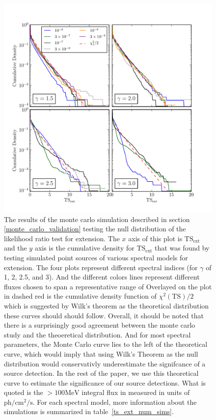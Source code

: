 \documentclass[preprint]{aastex}
\newcommand{\mev}{\text{MeV}\xspace}
\newcommand{\s}{\text{s}\xspace}
\newcommand{\ph}{\text{ph}\xspace}
\newcommand{\cm}{\text{cm}\xspace}
\newcommand{\tsext}{\ensuremath{\text{TS}_\text{ext}}\xspace}
\newcommand{\ts}{\text{TS}\xspace}
\begin{document}
\clearpage
\begin{figure}
  \begin{center}
    \includegraphics{mc_plots/ts_ext_emin_1000.pdf}
    \end{center}
    \caption{
    The results of the monte carlo simulation described in section
    \ref{monte_carlo_validation} testing the null distribution of
    the likelihood ratio test for extension.  The $x$ axis of this
    plot is \tsext and the $y$ axis is the cumulative density for
    \tsext that was found by testing simulated point sources of
    various spectral models for extension. The four plots represent
    different spectral indices (for $\gamma$ of 1, 2, 2.5, and 3).
    And the different colors lines represent different fluxes chosen
    to span a representative range of Overlayed on the plot in dashed
    red is the cumulative density function of $\chi^2(\ts)/2$ which is
    suggested by Wilk's theorem as the theoretical distribution these
    curves should should follow.  Overall, it should be noted that there
    is a surprisingly good agreement between the monte carlo study and
    the theoeretical distribution. And for most spectral parameters, the
    Monte Carlo curve lies to the left of the theoretical curve, which
    would imply that using Wilk's Theorem as the null distribution would
    conservativly underestimate the signifcance of a source detection. In
    the rest of the paper, we use this theoretical curve to estimate
    the significance of our source detections.  What is quoted is the
    $>100\mev$ integral flux in measured in units of $\ph/\cm^2/\s$.
    For each spectral model, more information about the simulations is
    summarized in table~\ref{ts_ext_num_sims}.
    }\label{ts_ext_mc}
  \end{figure}
\end{document}
